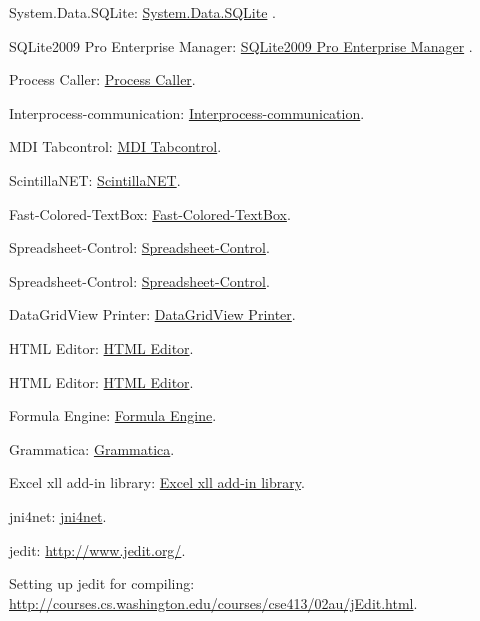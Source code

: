 	System.Data.SQLite: \href{http://system.data.sqlite.org/index.html/doc/trunk/www/index.wiki}{System.Data.SQLite} .
	
	SQLite2009 Pro Enterprise Manager: \href{http://osenxpsuite.net/download.htm}{SQLite2009 Pro Enterprise Manager} .
	
	
	
	Process Caller: \href{http://www.codeproject.com/Articles/4665/Launching-a-process-and-displaying-its-standard-ou}{Process Caller}.
	
	Interprocess-communication: \href{http://www.codeproject.com/Articles/6945/VB-NET-VB6-and-C-Interprocess-communication-via-Wi}{Interprocess-communication}.
	
	MDI Tabcontrol: \href{http://www.codeproject.com/Articles/16436/A-highly-configurable-MDI-tab-control-from-scratch}{MDI Tabcontrol}.
	
	ScintillaNET: \href{http://scintillanet.codeplex.com/}{ScintillaNET}.
	
	
	
	
	Fast-Colored-TextBox: \href{http://www.codeproject.com/Articles/161871/Fast-Colored-TextBox-for-syntax-highlighting}{Fast-Colored-TextBox}.
	
	Spreadsheet-Control: \href{http://www.codeproject.com/Articles/691749/Free-NET-Spreadsheet-Control}{Spreadsheet-Control}.
	
	Spreadsheet-Control: \href{http://reogrid.net/download/}{Spreadsheet-Control}.
	
	
	DataGridView Printer: \href{http://www.codeproject.com/Articles/18042/Another-DataGridView-Printer?}{DataGridView Printer}.
	
	HTML Editor: \href{http://www.codeproject.com/Articles/15559/A-Windows-Forms-based-text-editor-with-HTML-output}{HTML Editor}.
	
	HTML Editor: \href{http://www.bitroom.de/csharp_htmleditor.php}{HTML Editor}.
	
	Formula Engine: \href{http://www.codeproject.com/Articles/17853/Implementing-an-Excel-like-formula-engine}{Formula Engine}.
	
	Grammatica: \href{http://grammatica.percederberg.net/}{Grammatica}.
	
	Excel xll add-in library: \href{http://xll.codeplex.com/}{Excel xll add-in library}.
	
	jni4net: \href{http://jni4net.com/}{jni4net}.
	
	jedit: \href{http://www.jedit.org/}{http://www.jedit.org/}.
	
	Setting up jedit for compiling: \href{http://courses.cs.washington.edu/courses/cse413/02au/jEdit.html}{http://courses.cs.washington.edu/courses/cse413/02au/jEdit.html}.
	
